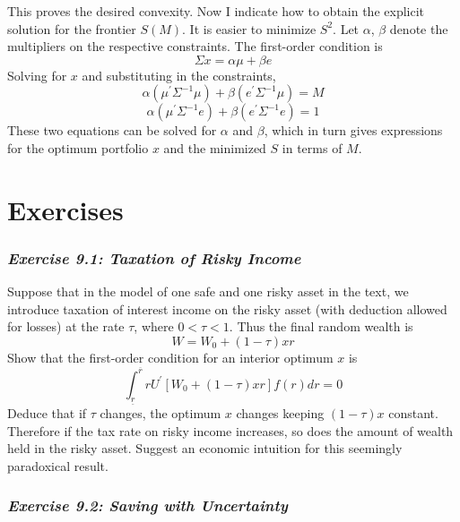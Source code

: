 This proves the desired convexity. Now I indicate how to obtain the explicit solution for the frontier $S(M)$. It is easier to minimize $S^2$. Let $\alpha$, $\beta$ denote the multipliers on the respective constraints. The first-order condition is 
\begin{equation*}
 \Sigma x = \alpha \mu + \beta e
\end{equation*}
Solving for $x$ and substituting in the constraints,
\begin{equation*}
\alpha (\mu^\prime \Sigma^{-1} \mu) + \beta (e^\prime \Sigma^{-1} \mu) = M
\end{equation*}
\begin{equation*}
\alpha (\mu^\prime \Sigma^{-1} e) + \beta (e^\prime \Sigma^{-1} e) = 1
\end{equation*}
These two equations can be solved for $\alpha$ and $\beta$, which in turn gives expressions for the optimum portfolio $x$ and the minimized $S$ in terms of $M$.

\section*{Exercises}

\subsubsection*{\textit{Exercise 9.1: Taxation of Risky Income}}

Suppose that in the model of one safe and one risky asset in the text, we introduce taxation of interest income on the risky asset (with deduction allowed for losses) at the rate $\tau$, where $0<\tau<1$. Thus the final random wealth is 
\begin{equation*}
W = W_0 + (1-\tau)xr
\end{equation*}
Show that the first-order condition for an interior optimum $x$ is
\begin{equation*}
\int_{\underline{r}}^{\overline{r}}  r U^\prime [W_0 +(1-\tau)xr ] f(r) dr = 0
\end{equation*}
Deduce that if $\tau$ changes, the optimum $x$ changes keeping $(1-\tau)x$ constant. Therefore if the tax rate on risky income increases, so does the amount of wealth held in the risky asset. Suggest an economic intuition for this seemingly paradoxical result.

\subsubsection*{\textit{Exercise 9.2: Saving with Uncertainty}}

